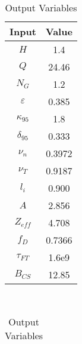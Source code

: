 \begin{table}[b!]
\centering
\caption{DEMO Steady Variables}
\hfill
\begin{subtable}[t]{0.4\textwidth}
\centering
\caption{Input Variables} ~\\
\begin{tabular}{ c|c }

Input            & Value           \\
\hline
$H$              & 1.4             \\
$Q$              & 24.46           \\
$N_{G}$          & 1.2             \\
$\varepsilon$       & 0.385           \\
$\kappa_{95}$    & 1.8             \\
$\delta_{95}$    & 0.333           \\
$\nu_{n}$        & 0.3972          \\
$\nu_{T}$        & 0.9187          \\
$l_{i}$          & 0.900             \\
$A$              & 2.856           \\
$Z_{eff}$        & 4.708           \\
$f_{D}$          & 0.7366          \\
$\tau_{FT}$      & 1.6e9           \\
$B_{CS}$         & 12.85           \\

\end{tabular}
\end{subtable}
\hfill
\begin{subtable}[t]{0.5\textwidth}
\centering
\caption{Output Variables} ~\\
\begin{tabular}{ c|c|c|c }


\end{tabular}
\end{subtable}
\end{table}
